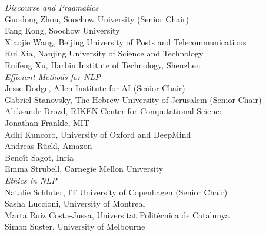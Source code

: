 \emph{Discourse and Pragmatics} \\
\hspace*{0.2in} Guodong Zhou, Soochow University (Senior Chair)\\
\hspace*{0.2in} Fang Kong, Soochow University\\
\hspace*{0.2in} Xiaojie Wang, Beijing University of Posts and Telecommunications\\
\hspace*{0.2in} Rui Xia, Nanjing University of Science and Technology\\
\hspace*{0.2in} Ruifeng Xu, Harbin Institute of Technology, Shenzhen\\

\emph{Efficient Methods for NLP} \\
\hspace*{0.2in} Jesse Dodge, Allen Institute for AI (Senior Chair)\\
\hspace*{0.2in} Gabriel Stanovsky, The Hebrew University of Jerusalem (Senior Chair)\\
\hspace*{0.2in} Aleksandr Drozd, RIKEN Center for Computational Science\\
\hspace*{0.2in} Jonathan Frankle, MIT\\
\hspace*{0.2in} Adhi Kuncoro, University of Oxford and DeepMind\\
\hspace*{0.2in} Andreas Rückl, Amazon\\
\hspace*{0.2in} Benoît Sagot, Inria\\
\hspace*{0.2in} Emma Strubell, Carnegie Mellon University\\

\emph{Ethics in NLP} \\
\hspace*{0.2in} Natalie Schluter, IT University of Copenhagen (Senior Chair)\\
\hspace*{0.2in} Sasha Luccioni, University of Montreal \\
\hspace*{0.2in} Marta Ruiz Costa-Jussa, Universitat Politècnica de Catalunya\\
\hspace*{0.2in} Simon Suster, University of Melbourne\\

